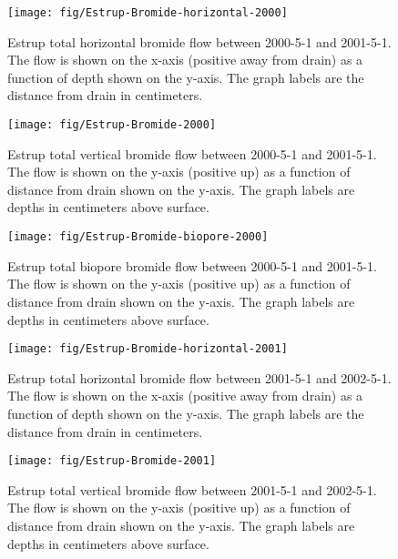 \begin{figure}[htbp]
  \centering
  \texttt{[image: fig/Estrup-Bromide-horizontal-2000]}
  
  \caption{Estrup total horizontal bromide flow between 2000-5-1 and
    2001-5-1.  The flow is shown on the x-axis (positive away from
    drain) as a function of depth shown on the y-axis.  The graph
    labels are the distance from drain in centimeters.}
  \label{fig:Estrup-Bromide-2000-horizontal}
\end{figure}\FloatBarrier

\begin{figure}[htbp]
  \centering
  \texttt{[image: fig/Estrup-Bromide-2000]}
  
  \caption{Estrup total vertical bromide flow between 2000-5-1 and
    2001-5-1.  The flow is shown on the y-axis (positive up) as a
    function of distance from drain shown on the y-axis.  The graph
    labels are depths in centimeters above surface.}
  \label{fig:Estrup-Bromide-2000-vertical}
\end{figure}\FloatBarrier

\begin{figure}[htbp]
  \centering
  \texttt{[image: fig/Estrup-Bromide-biopore-2000]}
  
  \caption{Estrup total biopore bromide flow between 2000-5-1 and
    2001-5-1.  The flow is shown on the y-axis (positive up) as a
    function of distance from drain shown on the y-axis.  The graph
    labels are depths in centimeters above surface.}
  \label{fig:Estrup-Bromide-biopore-2000}
\end{figure}\FloatBarrier

\begin{figure}[htbp]
  \centering
  \texttt{[image: fig/Estrup-Bromide-horizontal-2001]}
  
  \caption{Estrup total horizontal bromide flow between 2001-5-1 and
    2002-5-1.  The flow is shown on the x-axis (positive away from
    drain) as a function of depth shown on the y-axis.  The graph
    labels are the distance from drain in centimeters.}
  \label{fig:Estrup-Bromide-2001-horizontal}
\end{figure}\FloatBarrier

\begin{figure}[htbp]
  \centering
  \texttt{[image: fig/Estrup-Bromide-2001]}
  
  \caption{Estrup total vertical bromide flow between 2001-5-1 and
    2002-5-1.  The flow is shown on the y-axis (positive up) as a
    function of distance from drain shown on the y-axis.  The graph
    labels are depths in centimeters above surface.}
  \label{fig:Estrup-Bromide-2001-vertical}
\end{figure}\FloatBarrier

